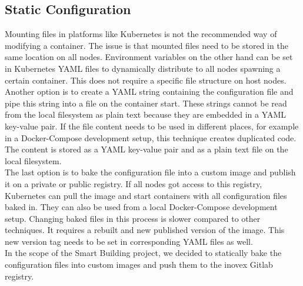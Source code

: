 \subsection{Static Configuration}
Mounting files in platforms like Kubernetes is not the recommended way of modifying a container. The issue is that mounted files need to be stored in the same location on all nodes. Environment variables on the other hand can be set in Kubernetes YAML files to dynamically distribute to all nodes spawning a certain container. This does not require a specific file structure on host nodes.\\
Another option is to create a YAML string containing the configuration file and pipe this string into a file on the container start. These strings cannot be read from the local filesystem as plain text because they are embedded in a YAML key-value pair. If the file content needs to be used in different places, for example in a Docker-Compose development setup, this technique creates duplicated code. The content is stored as a YAML key-value pair and as a plain text file on the local filesystem.\\
The last option is to bake the configuration file into a custom image and publish it on a private or public registry. If all nodes got access to this registry, Kubernetes can pull the image and start containers with all configuration files baked in. They can also be used from a local Docker-Compose development setup. Changing baked files in this process is slower compared to other techniques. It requires a rebuilt and new published version of the image. This new version tag needs to be set in corresponding YAML files as well.\\
In the scope of the Smart Building project, we decided to statically bake the configuration files into custom images and push them to the inovex Gitlab registry.

